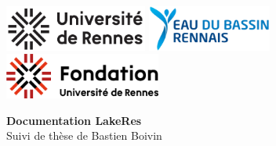
\begin{titlepage}
    \thispagestyle{empty}
    
    
    \begin{center}
      \includegraphics[height=1.5cm]{assets/figures/logos/Logo_Univ_Rennes.png}\hspace{1cm}%
      \includegraphics[height=1.5cm]{assets/figures/logos/Logo_EBR.png}\hspace{1cm}%
      \includegraphics[height=1.5cm]{assets/figures/logos/Logo_Fondation_Rennes.png}
      \vspace{2cm}
  
      {\Huge\textbf{Documentation LakeRes}}\\[0.5cm]
      {\Large Suivi de thèse de Bastien Boivin}
      \vspace{1.5cm}
  

\end{center}
\end{titlepage}

